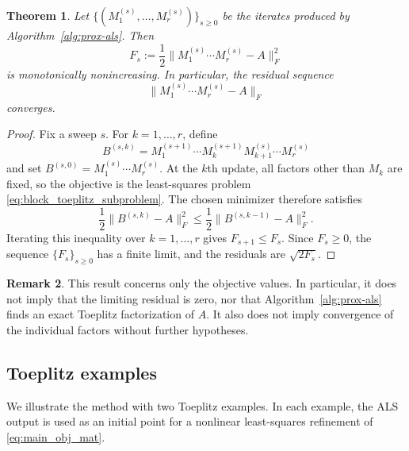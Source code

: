 \documentclass[reqno]{amsart}
\newtheorem{theorem}{Theorem}[section]
\theoremstyle{definition}
\newtheorem{remark}[theorem]{Remark}
\numberwithin{equation}{section}
\begin{document}
\begin{theorem}
Let $\{(M_1^{(s)},\dots,M_r^{(s)})\}_{s\ge 0}$ be the iterates produced by Algorithm~\ref{alg:prox-als}. Then
\[
F_s:=\frac12\|M_1^{(s)}\cdots M_r^{(s)}-A\|_F^2
\]
is monotonically nonincreasing. In particular, the residual sequence
\[
\|M_1^{(s)}\cdots M_r^{(s)}-A\|_F
\]
converges.
\end{theorem}

\begin{proof}
Fix a sweep $s$. For $k=1,\ldots,r$, define
\[
B^{(s,k)}=M_1^{(s+1)}\cdots M_k^{(s+1)}M_{k+1}^{(s)}\cdots M_r^{(s)}
\]
and set $B^{(s,0)}=M_1^{(s)}\cdots M_r^{(s)}$. At the $k$th update, all factors other than $M_k$ are fixed, so the objective is the least-squares problem \eqref{eq:block_toeplitz_subproblem}. The chosen minimizer therefore satisfies
\[
\frac12\|B^{(s,k)}-A\|_F^2\leq \frac12\|B^{(s,k-1)}-A\|_F^2.
\]
Iterating this inequality over $k=1,\ldots,r$ gives $F_{s+1}\leq F_s$. Since $F_s\geq 0$, the sequence $\{F_s\}_{s\geq 0}$ has a finite limit, and the residuals are $\sqrt{2F_s}$.
\end{proof}

\begin{remark}
This result concerns only the objective values. In particular, it does not imply that the limiting residual is zero, nor that Algorithm~\ref{alg:prox-als} finds an exact Toeplitz factorization of $A$. It also does not imply convergence of the individual factors without further hypotheses.
\end{remark}

\subsection{Toeplitz examples}
We illustrate the method with two Toeplitz examples. In each example, the ALS output is used as an initial point for a nonlinear least-squares refinement of \eqref{eq:main_obj_mat}.
\end{document}
